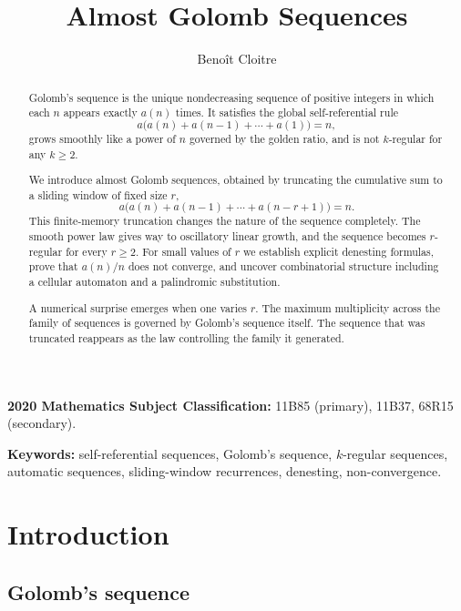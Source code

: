 \documentclass[12pt]{article}
\title{Almost Golomb Sequences}
\author{Beno\^it Cloitre}
\date{}
\theoremstyle{definition}
\theoremstyle{remark}
\begin{document}
\maketitle

\begin{abstract}
Golomb's sequence is the unique nondecreasing sequence of positive integers
in which each $n$ appears exactly $a(n)$ times. It satisfies the global
self-referential rule
\[
  a\bigl(a(n)+a(n-1)+\cdots+a(1)\bigr)=n,
\]
grows smoothly like a power of $n$ governed by the golden ratio,
and is not $k$-regular for any $k\ge 2$.

We introduce almost Golomb sequences, obtained by truncating the
cumulative sum to a sliding window of fixed size $r$,
\[
  a\bigl(a(n)+a(n-1)+\cdots+a(n-r+1)\bigr)=n.
\]
This finite-memory truncation changes the nature of the sequence completely.
The smooth power law gives way to oscillatory linear growth, and the
sequence becomes $r$-regular for every $r\ge 2$. For small values of $r$
we establish explicit denesting formulas, prove that $a(n)/n$ does not
converge, and uncover combinatorial structure including a cellular
automaton and a palindromic substitution.

A numerical surprise emerges when one varies $r$. The maximum multiplicity
across the family of sequences is governed by Golomb's sequence itself.
The sequence that was truncated reappears as the law controlling the
family it generated.
\end{abstract}

\noindent\textbf{2020 Mathematics Subject Classification:}
11B85 (primary), 11B37, 68R15 (secondary).

\noindent\textbf{Keywords:} self-referential sequences, Golomb's sequence,
$k$-regular sequences, automatic sequences, sliding-window recurrences,
denesting, non-convergence.

\section{Introduction}

\subsection{Golomb's sequence}\label{sec:golomb}
\end{document}
